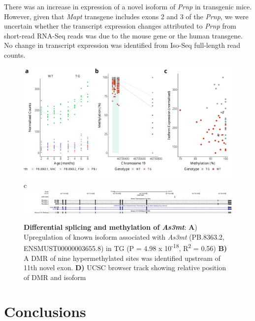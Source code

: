 There was an increase in expression of a novel isoform of \textit{Prnp} in transgenic mice. However, given that \textit{Mapt} transgene includes exons 2 and 3 of the \textit{Prnp}, we were uncertain whether the transcript expression changes attributed to \textit{Prnp} from short-read RNA-Seq reads was due to the mouse gene or the human transgene. No change in transcript expression was identified from Iso-Seq full-length read counts. 

\begin{figure}[htp]
	\includegraphics[page=1,scale = 0.4]{Figures/WholeDifferentialAnalysis_DMPDMR.pdf}
	\\
	\hspace*{0.2cm}\vspace{0.5cm}\large c
	\\
	\includegraphics[page=1,trim={1.5cm 0 0 0},scale = 0.9]{Figures/AS3MT_DMP.pdf}
	\captionsetup{width=0.95\textwidth}
	\caption[Differential splicing and methylation of \textit{As3mt}]%
	{\textbf{Differential splicing and methylation of \textit{As3mt}}: \textbf{A}) Upregulation of known isoform associated with \textit{As3mt} (PB.8363.2, ENSMUST00000003655.8) in TG (P = 4.98 x 10\textsuperscript{-18}, R\textsuperscript{2} = 0.56) \textbf{B)} A DMR of nine hypermethylated sites was identified upstream of 11th novel exon. \textbf{D)} UCSC browser track showing relative position of DMR and isoform}    
	\label{fig:IntMeth_As3mt}
\end{figure}	

\newpage
\section{Conclusions}






